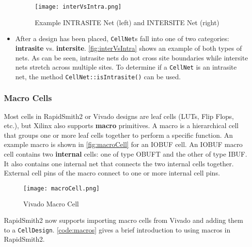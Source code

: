 \begin{itemize}
 \begin{figure}[t!]
   \centering
   \texttt{[image: interVsIntra.png]}
   \caption{Example INTRASITE Net (left) and INTERSITE Net (right)}
   \label{fig:interVsIntra}
  \end{figure}
  
  \item After a design has been placed, \texttt{CellNet}s fall into one of two
  categories: \textbf{intrasite} vs. \textbf{intersite}.
  \autoref{fig:interVsIntra} shows an example of both types of nets. As can be
  seen, intrasite nets do not cross site boundaries while intersite nets stretch
  across multiple sites. To determine if a \texttt{CellNet} is an intrasite
  net, the method \texttt{CellNet::isIntrasite()} can be used. 
 
\end{itemize}

\subsubsection{Macro Cells} \label{sec:macros}

Most cells in RapidSmith2 or Vivado designs are leaf cells (LUTs, Flip Flops,
etc.), but Xilinx also supports \textbf{macro} primitives. A macro is a
hierarchical cell that groups one or more leaf cells together to perform a
specific function. An example macro is shown in \autoref{fig:macroCell} for an
IOBUF cell. An IOBUF macro cell contains two \textbf{internal} cells: one of
type OBUFT and the other of type IBUF. It also contains one internal net that
connects the two internal cells together. External cell pins of the macro
connect to one or more internal cell pins.

\begin{figure}[H]
  \centering
  \texttt{[image: macroCell.png]}
  \caption{Vivado Macro Cell}
  \label{fig:macroCell}
\end{figure}

RapidSmith2 now supports importing macro cells from Vivado and adding them to a
\texttt{CellDesign}. \autoref{code:macros} gives a brief introduction to using
macros in RapidSmith2.

